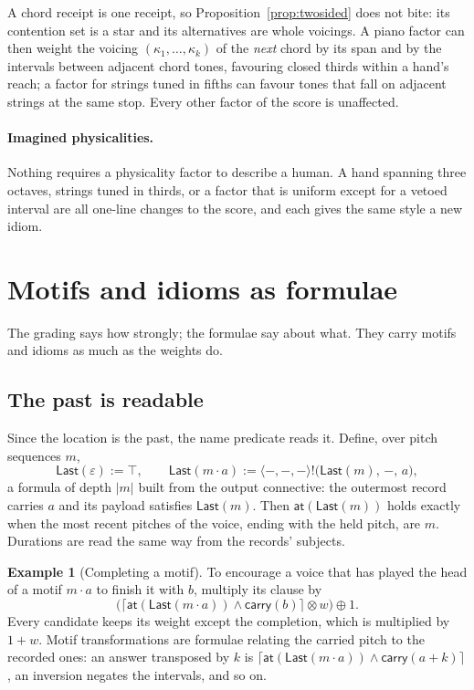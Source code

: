 \documentclass[11pt,a4paper]{article}
\theoremstyle{plain}
\theoremstyle{definition}
\newtheorem{example}[theorem]{Example}
\theoremstyle{remark}
\newcommand{\tensorv}{\otimes}
\newcommand{\sumv}{\oplus}
\newcommand{\crisp}[1]{\lceil #1 \rceil}
\newcommand{\atm}[1]{\mathsf{#1}}
\begin{document}
A chord receipt is one receipt, so Proposition~\ref{prop:twosided} does not bite:
its contention set is a star and its alternatives are whole voicings. A piano
factor can then weight the voicing $(\kappa_1,\dots,\kappa_k)$ of the
\emph{next} chord by its span and by the intervals between adjacent chord tones,
favouring closed thirds within a hand's reach; a factor for strings tuned in
fifths can favour tones that fall on adjacent strings at the same stop. Every
other factor of the score is unaffected.

\paragraph{Imagined physicalities.} Nothing requires a physicality factor to
describe a human. A hand spanning three octaves, strings tuned in thirds, or a
factor that is uniform except for a vetoed interval are all one-line changes to
the score, and each gives the same style a new idiom.

\section{Motifs and idioms as formulae}\label{sec:idioms}

The grading says how strongly; the formulae say about what. They carry motifs
and idioms as much as the weights do.

\subsection{The past is readable}

Since the location is the past, the name predicate reads it. Define, over
pitch sequences $m$,
\[
\mathsf{Last}(\varepsilon) := \top ,
\qquad
\mathsf{Last}(m\cdot a) := \langle{-},{-},{-}\rangle!\big(\mathsf{Last}(m),\,{-},\,a\big),
\]
a formula of depth $|m|$ built from the output connective: the outermost record
carries $a$ and its payload satisfies $\mathsf{Last}(m)$. Then
$\atm{at}(\mathsf{Last}(m))$ holds exactly when the most recent pitches of the
voice, ending with the held pitch, are $m$. Durations are read the same way from
the records' subjects.

\begin{example}[Completing a motif]\label{ex:motif}
To encourage a voice that has played the head of a motif $m\cdot a$ to finish it
with $b$, multiply its clause by
\[
\big(\crisp{\atm{at}(\mathsf{Last}(m\cdot a))\wedge\atm{carry}(b)} \tensorv w\big)
\sumv 1 .
\]
Every candidate keeps its weight except the completion, which is multiplied by
$1+w$. Motif transformations are formulae relating the carried pitch to the
recorded ones: an answer transposed by $k$ is
$\crisp{\atm{at}(\mathsf{Last}(m\cdot a))\wedge\atm{carry}(a+k)}$, an inversion
negates the intervals, and so on.
\end{example}
\end{document}
